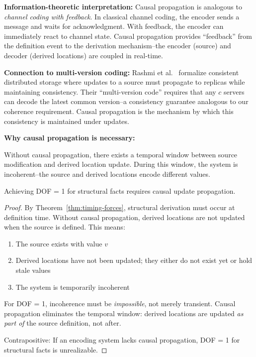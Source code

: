 \textbf{Information-theoretic interpretation:} Causal propagation is analogous to \emph{channel coding with feedback}. In classical channel coding, the encoder sends a message and waits for acknowledgment. With feedback, the encoder can immediately react to channel state. Causal propagation provides ``feedback'' from the definition event to the derivation mechanism--the encoder (source) and decoder (derived locations) are coupled in real-time.

\textbf{Connection to multi-version coding:} Rashmi et al.~\cite{rashmi2015multiversion} formalize consistent distributed storage where updates to a source must propagate to replicas while maintaining consistency. Their ``multi-version code'' requires that any $c$ servers can decode the latest common version--a consistency guarantee analogous to our coherence requirement. Causal propagation is the mechanism by which this consistency is maintained under updates.

\textbf{Why causal propagation is necessary:}

Without causal propagation, there exists a temporal window between source modification and derived location update. During this window, the system is incoherent--the source and derived locations encode different values.

\begin{theorem}[Causal Propagation is Necessary for DOF = 1]\label{thm:causal-necessary}
Achieving DOF = 1 for structural facts requires causal update propagation.
\end{theorem}

\begin{proof}
By Theorem~\ref{thm:timing-forces}, structural derivation must occur at definition time. Without causal propagation, derived locations are not updated when the source is defined. This means:
\begin{enumerate}
\tightlist
\item The source exists with value $v$
\item Derived locations have not been updated; they either do not exist yet or hold stale values
\item The system is temporarily incoherent
\end{enumerate}

For DOF = 1, incoherence must be \emph{impossible}, not merely transient. Causal propagation eliminates the temporal window: derived locations are updated \emph{as part of} the source definition, not after.

Contrapositive: If an encoding system lacks causal propagation, DOF = 1 for structural facts is unrealizable.
\end{proof}

